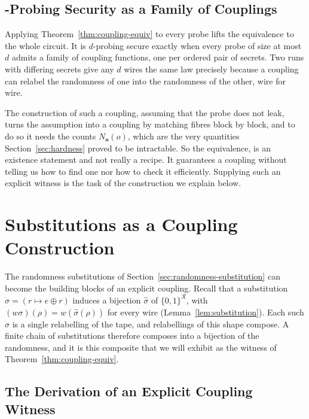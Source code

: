   \subsection{-Probing Security as a Family of Couplings}
  \label{sec:dprobing-couplings}

  Applying Theorem~\ref{thm:coupling-equiv} to every probe lifts the equivalence
  to the whole circuit. It is $d$-probing secure exactly when every probe of size
  at most $d$ admits a family of coupling functions, one per ordered pair of
  secrets. Two runs with differing secrets give any $d$ wires the same law
  precisely because a coupling can relabel the randomness of one into the
  randomness of the other, wire for wire.

  The construction of such a coupling, assuming that the probe does not leak, turns
  the assumption into a coupling by matching fibres block by block, and to do so it needs
  the counts $N_{\mathbf{a}}(o)$, which are the very quantities Section~\ref{sec:hardness}
  proved to be intractable. So the equivalence, is an existence
  statement and not really a recipe. It guarantees a coupling without telling us how to
  find one nor how to check it efficiently. Supplying such an explicit
  witness is the task of the construction we explain below.

\section{Substitutions as a Coupling Construction}
\label{sec:subst-coupling}

The randomness substitutions of Section~\ref{sec:randomness-substitution} can become the
building blocks of an explicit coupling. Recall that a substitution
$\sigma = (r \mapsto e \oplus r)$ induces a bijection
$\widehat{\sigma}$ of $\{0,1\}^{\mathcal{R}}$, with
$(w\sigma)(\rho) = w(\widehat{\sigma}(\rho))$ for every wire
(Lemma~\ref{lem:substitution}). Each such $\widehat{\sigma}$ is a single relabelling
of the tape, and relabellings of this shape
compose. A finite chain of substitutions therefore composes into a bijection of the
randomness, and it is this composite that we will exhibit as the witness of
Theorem~\ref{thm:coupling-equiv}.

  \subsection{The Derivation of an Explicit Coupling Witness}
  \label{sec:derivation-witness}

